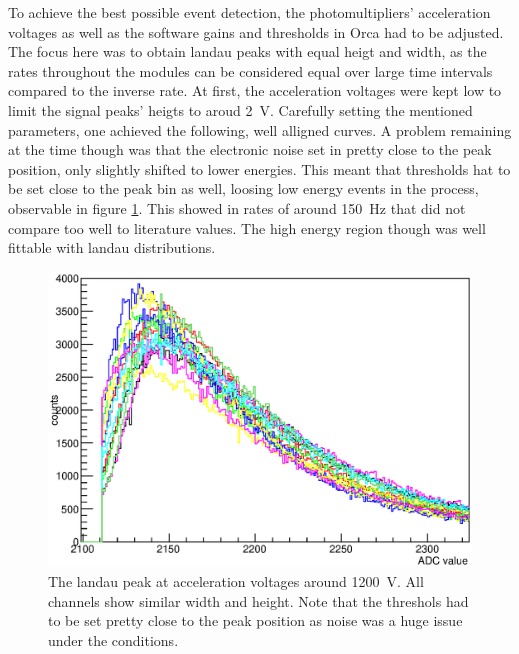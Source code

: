 	To achieve the best possible event detection, the photomultipliers' acceleration voltages as well as the software gains and thresholds in Orca had to be adjusted.
	The focus here was to obtain landau peaks with equal heigt and width, as the rates throughout the modules can be considered equal over large time intervals compared to the inverse rate.
	At first, the acceleration voltages were kept low to limit the signal peaks' heigts to aroud \SI{2}{\volt}. Carefully setting the mentioned parameters, one achieved the following, well alligned curves. A problem remaining at the time though was that the electronic noise set in pretty close to the peak position, only slightly shifted to lower energies. This meant that thresholds hat to be set close to the peak bin as well, loosing low energy events in the process, observable in figure \ref{fig:allPeaksBefore}. This showed in rates of around \SI{150}{\hertz} that did not compare too well to literature values. The high energy region though was well fittable with landau distributions.\\
	\begin{figure}
		\centering
		\includegraphics[width = 0.9 \textwidth]{graphics/setup/LandauPeaksRun660_old.eps}
		\caption[Landau peak \SI{1200}{\volt} acceleration voltage]{The landau peak at acceleration voltages around \SI{1200}{\volt}. All channels show similar width and height. Note that the threshols had to be set pretty close to the peak position as noise was a huge issue under the conditions.}
		\label{fig:allPeaksBefore}
	\end{figure}\\
